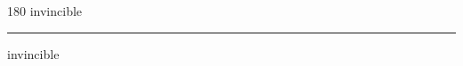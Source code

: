 
\begin{frame}
\begin{center}
\begin{turn}{180}
{\fontsize{2.5cm}{1em}\selectfont invincible}
\end{turn}
\vspace{1em}\par  
\hrule
\vspace{1em}\par  
{\fontsize{2.5cm}{1em}\selectfont invincible}
\end{center}
\end{frame}
